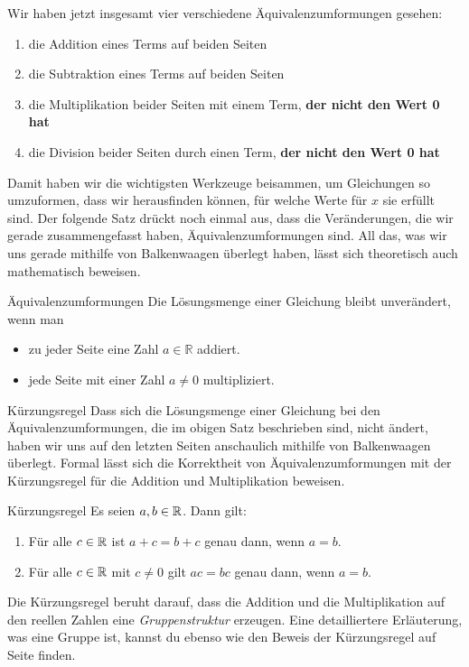 \documentclass[../../main.tex]{subfiles}
\begin{document}
Wir haben jetzt insgesamt vier verschiedene Äquivalenzumformungen gesehen:
\begin{enumerate}
    \item die Addition eines Terms auf beiden Seiten
    \item die Subtraktion eines Terms auf beiden Seiten
    \item die Multiplikation beider Seiten mit einem Term, \textbf{der nicht den Wert 0 hat}
    \item die Division beider Seiten durch einen Term, \textbf{der nicht den Wert 0 hat}
\end{enumerate}

Damit haben wir die wichtigsten Werkzeuge beisammen, um Gleichungen so umzuformen, dass wir herausfinden können, für welche Werte für $x$ sie erfüllt sind. Der folgende Satz drückt noch einmal aus, dass die Veränderungen, die wir gerade zusammengefasst haben, Äquivalenzumformungen sind. All das, was wir uns gerade mithilfe von Balkenwaagen überlegt haben, lässt sich theoretisch auch mathematisch beweisen.

\begin{theorem}{Äquivalenzumformungen}
    Die Lösungsmenge einer Gleichung bleibt unverändert, wenn man
    \begin{itemize}
        \item zu jeder Seite eine Zahl $a\in\mathbb{R}$ addiert.
        \item jede Seite mit einer Zahl $a\neq 0$ multipliziert.
    \end{itemize}
\end{theorem}
\begin{advanced}{Kürzungsregel}
    Dass sich die Lösungsmenge einer Gleichung bei den Äquivalenzumformungen, die im obigen Satz beschrieben sind, nicht ändert, haben wir uns auf den letzten Seiten anschaulich mithilfe von Balkenwaagen überlegt. Formal lässt sich die Korrektheit von Äquivalenzumformungen mit der Kürzungsregel für die Addition und Multiplikation beweisen.
    
    \begin{theorem}{Kürzungsregel}
        Es seien $a,b\in\mathbb{R}$. Dann gilt: 
        \begin{enumerate}
            \item Für alle $c\in\mathbb{R}$ ist $a+c=b+c$ genau dann, wenn $a=b$.
            \item Für alle $c\in\mathbb{R}$ mit $c\neq 0$ gilt $ac=bc$ genau dann, wenn $a=b$.
        \end{enumerate}
    \end{theorem}
    
    Die Kürzungsregel beruht darauf, dass die Addition und die Multiplikation auf den reellen Zahlen eine \emph{Gruppenstruktur} erzeugen. Eine detailliertere Erläuterung, was eine Gruppe ist, kannst du ebenso wie den Beweis der Kürzungsregel auf Seite \pageref{} finden. 
\end{advanced}
\end{document}
